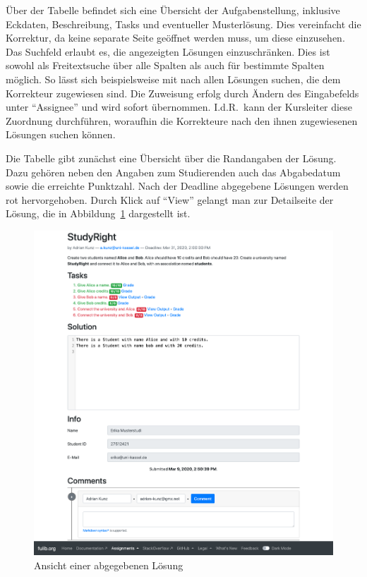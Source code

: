 Über der Tabelle befindet sich eine Übersicht der Aufgabenstellung, inklusive Eckdaten, Beschreibung, Tasks und eventueller Musterlösung.
Dies vereinfacht die Korrektur, da keine separate Seite geöffnet werden muss, um diese einzusehen.
Das Suchfeld erlaubt es, die angezeigten Lösungen einzuschränken.
Dies ist sowohl als Freitextsuche über alle Spalten als auch für bestimmte Spalten möglich.
So lässt sich beispielsweise mit  nach allen Lösungen suchen, die dem Korrekteur  zugewiesen sind.
Die Zuweisung erfolg durch Ändern des Eingabefelds unter ``Assignee'' und wird sofort übernommen.
I.d.R.\ kann der Kursleiter diese Zuordnung durchführen, woraufhin die Korrekteure nach den ihnen zugewiesenen Lösungen suchen können.

Die Tabelle gibt zunächst eine Übersicht über die Randangaben der Lösung.
Dazu gehören neben den Angaben zum Studierenden auch das Abgabedatum sowie die erreichte Punktzahl.
Nach der Deadline abgegebene Lösungen werden rot hervorgehoben.
Durch Klick auf ``View'' gelangt man zur Detailseite der Lösung, die in Abbildung~\ref{fig:solution} dargestellt ist.

\begin{figure}
    \centering
    \includegraphics[width=\textwidth]{chapter/fulib.org/img/solution.png}
    \caption{Ansicht einer abgegebenen Lösung}
    \label{fig:solution}
\end{figure}

